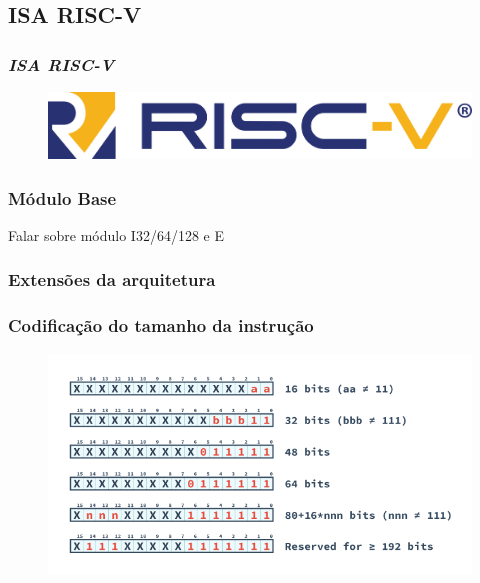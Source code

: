 \documentclass{beamer}
\begin{document}
    \subsection{ISA RISC-V}
    \begin{frame}
        \frametitle{\textit{\textbf{ISA RISC-V}}}
        \begin{figure}[H]
        \centering
            \includegraphics[width=.9\textwidth,height=.9\textheight,keepaspectratio]{../images/riscv_logo.png}
        \end{figure}
    \end{frame}

    \begin{frame}
        \frametitle{Módulo Base}
        {Falar sobre módulo I32/64/128 e E}
    \end{frame}

    \begin{frame}
        \frametitle{Extensões da arquitetura}
        {}
    \end{frame}

    \begin{frame}
        \frametitle{Codificação do tamanho da instrução}
        \begin{figure}[H]
        \centering
            \includegraphics[width=.9\textwidth,height=.9\textheight,keepaspectratio]{../images/RV_InstructionLength.png}
        \end{figure}
    \end{frame}
\end{document}
